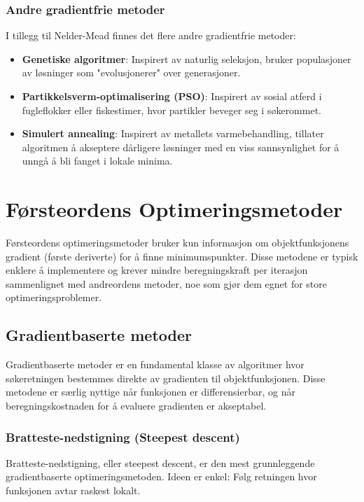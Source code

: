 \subsection{Andre gradientfrie metoder}

I tillegg til Nelder-Mead finnes det flere andre gradientfrie metoder:

\begin{itemize}
	\item \textbf{Genetiske algoritmer}: Inspirert av naturlig seleksjon, bruker populasjoner av løsninger som "evolusjonerer" over generasjoner.
	\item \textbf{Partikkelsverm-optimalisering (PSO)}: Inspirert av sosial atferd i fugleflokker eller fiskestimer, hvor partikler beveger seg i søkerommet.
	\item \textbf{Simulert annealing}: Inspirert av metallets varmebehandling, tillater algoritmen å akseptere dårligere løsninger med en viss sannsynlighet for å unngå å bli fanget i lokale minima.
\end{itemize}

\chapter{Førsteordens Optimeringsmetoder}
\label{chap:first_order_methods}

Førsteordens optimeringsmetoder bruker kun informasjon om objektfunksjonens gradient (første deriverte) for å finne minimumspunkter. Disse metodene er typisk enklere å implementere og krever mindre beregningskraft per iterasjon sammenlignet med andreordens metoder, noe som gjør dem egnet for store optimeringsproblemer.

\section{Gradientbaserte metoder}
\label{sec:gradient_based_methods}

Gradientbaserte metoder er en fundamental klasse av algoritmer hvor søkeretningen bestemmes direkte av gradienten til objektfunksjonen. Disse metodene er særlig nyttige når funksjonen er differensierbar, og når beregningskostnaden for å evaluere gradienten er akseptabel.

\subsection{Bratteste-nedstigning (Steepest descent)}

Bratteste-nedstigning, eller steepest descent, er den mest grunnleggende gradientbaserte optimeringsmetoden. Ideen er enkel: Følg retningen hvor funksjonen avtar raskest lokalt.

